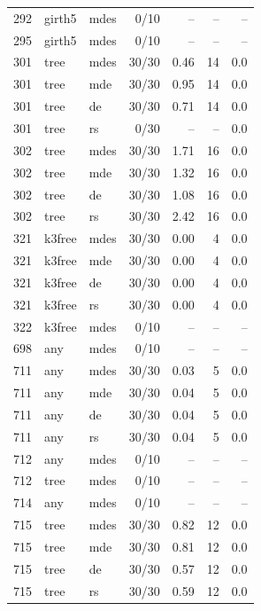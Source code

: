 \begin{tabular}{rl l rrr r}
292 & girth5 & mdes & 0/10 & -- & -- & --\\
295 & girth5 & mdes & 0/10 & -- & -- & --\\
301 & tree & mdes & 30/30 & 0.46 & 14 & 0.0\\
301 & tree & mde & 30/30 & 0.95 & 14 & 0.0\\
301 & tree & de & 30/30 & 0.71 & 14 & 0.0\\
301 & tree & rs & 0/30 & -- & -- & 0.0\\
302 & tree & mdes & 30/30 & 1.71 & 16 & 0.0\\
302 & tree & mde & 30/30 & 1.32 & 16 & 0.0\\
302 & tree & de & 30/30 & 1.08 & 16 & 0.0\\
302 & tree & rs & 30/30 & 2.42 & 16 & 0.0\\
321 & k3free & mdes & 30/30 & 0.00 & 4 & 0.0\\
321 & k3free & mde & 30/30 & 0.00 & 4 & 0.0\\
321 & k3free & de & 30/30 & 0.00 & 4 & 0.0\\
321 & k3free & rs & 30/30 & 0.00 & 4 & 0.0\\
322 & k3free & mdes & 0/10 & -- & -- & --\\
698 & any & mdes & 0/10 & -- & -- & --\\
711 & any & mdes & 30/30 & 0.03 & 5 & 0.0\\
711 & any & mde & 30/30 & 0.04 & 5 & 0.0\\
711 & any & de & 30/30 & 0.04 & 5 & 0.0\\
711 & any & rs & 30/30 & 0.04 & 5 & 0.0\\
712 & any & mdes & 0/10 & -- & -- & --\\
712 & tree & mdes & 0/10 & -- & -- & --\\
714 & any & mdes & 0/10 & -- & -- & --\\
715 & tree & mdes & 30/30 & 0.82 & 12 & 0.0\\
715 & tree & mde & 30/30 & 0.81 & 12 & 0.0\\
715 & tree & de & 30/30 & 0.57 & 12 & 0.0\\
715 & tree & rs & 30/30 & 0.59 & 12 & 0.0\\
\hline
\end{tabular}
